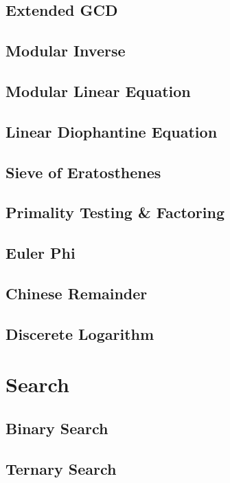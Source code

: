 		\subsection{Extended GCD}
			
		\subsection{Modular Inverse}
			
		\subsection{Modular Linear Equation}
			
		\subsection{Linear Diophantine Equation}
			
		\subsection{Sieve of Eratosthenes}
			
		\subsection{Primality Testing \& Factoring}
			
		\subsection{Euler Phi}
			
		\subsection{Chinese Remainder}
			
		\subsection{Discerete Logarithm}
			
	\section{Search}
		\subsection{Binary Search}
			
		\subsection{Ternary Search}
			
